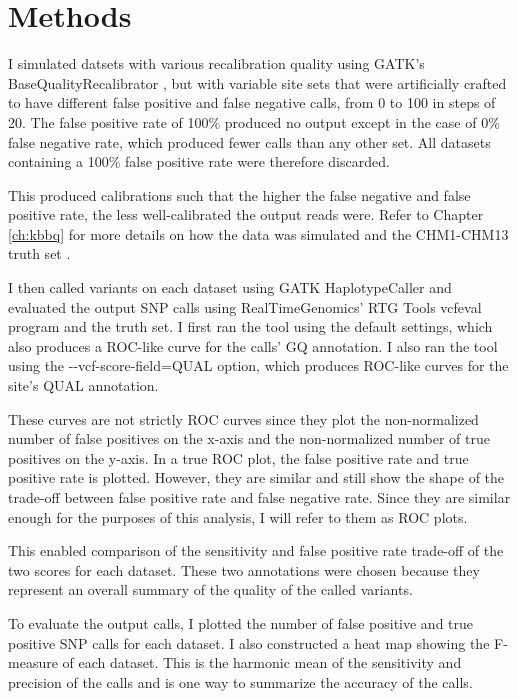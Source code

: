 \documentclass{report}
\begin{document}
\section{Methods}
\begin{outline}
\item I simulated datsets with various recalibration quality using GATK's BaseQualityRecalibrator \parencite{auwera_fastq_2013}, but with variable site sets that were artificially crafted to have different false positive and false negative calls, from 0 to 100 in steps of 20. The false positive rate of 100\% produced no output except in the case of 0\% false negative rate, which produced fewer calls than any other set. All datasets containing a 100\% false positive rate were therefore discarded.
\item This produced calibrations such that the higher the false negative and false positive rate, the less well-calibrated the output reads were. Refer to Chapter \ref{ch:kbbq} for more details on how the data was simulated and the CHM1-CHM13 truth set \parencite{li_synthetic-diploid_2018}.
\item I then called variants on each dataset using GATK HaplotypeCaller \parencite{poplin_scaling_2018} and evaluated the output SNP calls using RealTimeGenomics' RTG Tools vcfeval program \parencite{cleary_comparing_2015} and the truth set. I first ran the tool using the default settings, which also produces a ROC-like curve for the calls' GQ annotation. I also ran the tool using the -\phantom{}-vcf-score-field=QUAL option, which produces ROC-like curves for the site's QUAL annotation.
\item These curves are not strictly ROC curves since they plot the non-normalized number of false positives on the x-axis and the non-normalized number of true positives on the y-axis. In a true ROC plot, the false positive rate and true positive rate is plotted. However, they are similar and still show the shape of the trade-off between false positive rate and false negative rate. Since they are similar enough for the purposes of this analysis, I will refer to them as ROC plots.
\item This enabled comparison of the sensitivity and false positive rate trade-off of the two scores for each dataset. These two annotations were chosen because they represent an overall summary of the quality of the called variants.

\item To evaluate the output calls, I plotted the number of false positive and true positive SNP calls for each dataset. I also constructed a heat map showing the F-measure of each dataset. This is the harmonic mean of the sensitivity and precision of the calls and is one way to summarize the accuracy of the calls.


\end{outline}
\end{document}
